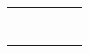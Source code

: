 \documentclass[12pt,a4paper]{article}
\begin{document}
\begin{landscape}
\begin{table}[ht!]
\begin{tabular}{|c|l|l|l|c|c|}
			                                                       &                           &                                     & &  &                                                                                                                                                        \\\cline{3-4}
			                                                       &                           & \multirow{1}{*}{\gbbbbbbbbbb}       & &  &                                                                                                                                                        \\\cline{3-4}
			                                                       &                           & \multirow{2}{*}{\gbbbbbbbbbbb}      & &  &                                                                                                                                                        \\\cline{4-4}
			                                                       &                           &                                     & &  &                                                                                                                                                        \\\cline{3-4}
			                                                       &                           & \multirow{2}{*}{\gbbbbbbbbbbbb}     & &  &                                                                                                                                                        \\\cline{4-4}
			                                                       &                           &                                     & &  &                                                                                                                                                        \\\cline{2-4}
			                                                       & \multirow{7}{*}{\dimiiii} & \multirow{2}{*}{\gbbbbbbbbbbbbb}    & &  &                                                                                                                                                        \\\cline{4-4}
			                                                       &                           &                                     & &  &                                                                                                                                                        \\\cline{3-4}

\end{tabular}
\end{table}
\end{landscape}
\end{document}
